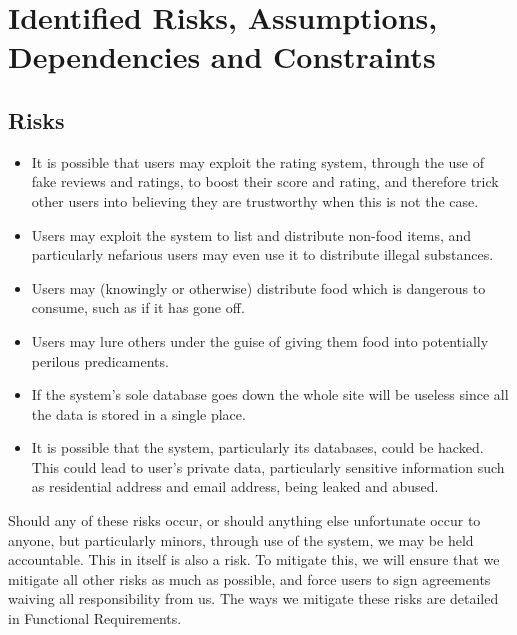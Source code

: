 \documentclass[12pt]{article}
\begin{document}
\section{Identified Risks, Assumptions, Dependencies and Constraints}
\subsection{Risks}
\begin{itemize}

    \item It is possible that users may exploit the rating system,
        through the use of fake reviews and ratings,
        to boost their score and rating, and therefore trick
        other users into believing they are trustworthy when this is not the case.

    \item Users may exploit the system to list and distribute non-food items,
        and particularly nefarious users may even use it to distribute illegal substances.
    
    \item Users may (knowingly or otherwise) distribute food which is dangerous
        to consume, such as if it has gone off.
    
    \item Users may lure others under the guise of giving them food into
        potentially perilous predicaments.
    
    \item If the system’s sole database goes down the whole site will be
        useless since all the data is stored in a single place.
    
    \item It is possible that the system, particularly its databases, could be hacked.
        This could lead to user’s private data, particularly sensitive
        information such as residential address and email address, being leaked and abused.
    
    \end{itemize}

Should any of these risks occur, or should anything else unfortunate occur
to anyone, but particularly minors, through use of the system,
we may be held accountable.
This in itself is also a risk.
To mitigate this, we will ensure that we mitigate all other risks as much
as possible, and force users to sign agreements waiving all responsibility from us.
The ways we mitigate these risks are detailed in Functional Requirements.
\end{document}
